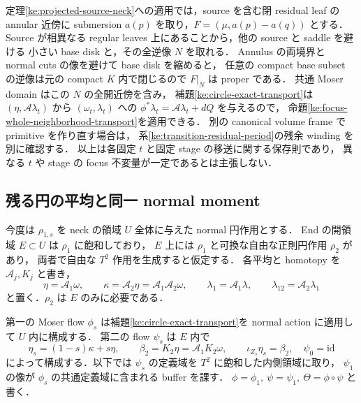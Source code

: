定理\ref{ke:projected-source-neck}への適用では，source を含む閉 residual leaf の
annular 近傍に submersion $a(p)$ を取り，$F=(\mu,a(p)-a(q))$ とする．
Source が相異なる regular leaves 上にあることから，他の source と saddle を避ける
小さい base disk と，その全逆像 $N$ を取れる．
Annulus の両境界と normal cuts の像を避けて base disk を縮めると，
任意の compact base subset の逆像は元の compact $K$ 内で閉じるので $F|_N$ は proper である．
共通 Moser domain はこの $N$ の全開近傍を含み，
補題\ref{ke:circle-exact-transport}は
$(\eta,\mathcal A\lambda_t)$ から $(\omega_t,\lambda_t)$ への
$\phi^*\lambda_t=\mathcal A\lambda_t+dQ$ を与えるので，
命題\ref{ke:focus-whole-neighborhood-transport}を適用できる．
別の canonical volume frame で primitive を作り直す場合は，
系\ref{ke:transition-residual-period}の残余 winding を別に確認する．
以上は各固定 $t$ と固定 stage の移送に関する保存則であり，
異なる $t$ や stage の focus 不変量が一定であるとは主張しない．

\subsection{残る円の平均と同一 normal moment}

今度は $\rho_{1,s}$ を neck の領域 $U$ 全体に与えた normal 円作用とする．
End の開領域 $E\subset U$ は $\rho_1$ に飽和しており，
$E$ 上には $\rho_1$ と可換な自由な正則円作用 $\rho_2$ があり，
両者で自由な $T^2$ 作用を生成すると仮定する．
各平均と homotopy を $\mathcal A_j,K_j$ と書き，
\[
 \eta=\mathcal A_1\omega,\qquad
 \kappa=\mathcal A_2\eta=\mathcal A_1\mathcal A_2\omega,\qquad
 \lambda_1=\mathcal A_1\lambda,\qquad
 \lambda_{12}=\mathcal A_2\lambda_1
\]
と置く．$\rho_2$ は $E$ のみに必要である．

第一の Moser flow $\phi_s$ は補題\ref{ke:circle-exact-transport}を
normal action に適用して $U$ 内に構成する．
第二の flow $\psi_s$ は $E$ 内で
\begin{equation}\label{ke:eq:residual-moser-path}
 \eta_s=(1-s)\kappa+s\eta,\qquad
 \beta_2=K_2\eta=\mathcal A_1K_2\omega,\qquad
 \iota_{Z_s}\eta_s=\beta_2,\quad \psi_0=\mathrm{id}
\end{equation}
によって構成する．以下では $\psi_s$ の定義域を $T^2$ に飽和した内側領域に取り，
$\psi_1$ の像が $\phi_s$ の共通定義域に含まれる buffer を課す．
$\phi=\phi_1,\ \psi=\psi_1,\ \Theta=\phi\circ\psi$ と書く．

